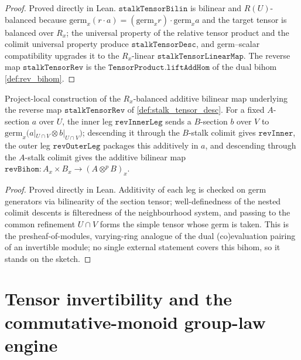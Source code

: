 \begin{proof}
  Proved directly in Lean. \(\mathtt{stalkTensorBilin}\) is bilinear and
  \(R(U)\)-balanced because \(\mathrm{germ}_x(r\cdot a) = (\mathrm{germ}_x r)\cdot
  \mathrm{germ}_x a\) and the target tensor is balanced over \(R_x\); the universal
  property of the relative tensor product and the colimit universal property produce
  \(\mathtt{stalkTensorDesc}\), and germ--scalar compatibility upgrades it to the
  \(R_x\)-linear \(\mathtt{stalkTensorLinearMap}\). The reverse map
  \(\mathtt{stalkTensorRev}\) is the \(\mathtt{TensorProduct.liftAddHom}\) of the dual
  bihom \cref{def:rev_bihom}.
\end{proof}

\begin{definition}
  \label{def:rev_bihom}
  Project-local construction of the \(R_x\)-balanced additive bilinear map underlying the
  reverse map \(\mathtt{stalkTensorRev}\) of \cref{def:stalk_tensor_desc}. For a fixed
  \(A\)-section \(a\) over \(U\), the inner leg \(\mathtt{revInnerLeg}\) sends a
  \(B\)-section \(b\) over \(V\) to \(\mathrm{germ}_x\bigl(a|_{U\cap V} \otimes
  b|_{U\cap V}\bigr)\); descending it through the \(B\)-stalk colimit gives
  \(\mathtt{revInner}\), the outer leg \(\mathtt{revOuterLeg}\) packages this additively in
  \(a\), and descending through the \(A\)-stalk colimit gives the additive bilinear map
  \(\mathtt{revBihom}\colon A_x \times B_x \to (A \otimes^{p} B)_x\).
\end{definition}
\begin{proof}
  Proved directly in Lean. Additivity of each leg is checked on germ generators via
  bilinearity of the section tensor; well-definedness of the nested colimit descents is
  filteredness of the neighbourhood system, and passing to the common refinement
  \(U\cap V\) forms the simple tensor whose germ is taken. This is the
  presheaf-of-modules, varying-ring analogue of the dual (co)evaluation pairing of an
  invertible module; no single external statement covers this bihom, so it stands on the
  sketch.
\end{proof}

\section{Tensor invertibility and the commutative-monoid group-law engine}
\label{sec:tensorobj_invertibility}

